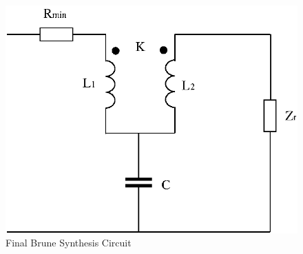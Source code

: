 \begin{figure}[ht]
\centering
\includegraphics[scale=0.7]{./Imgs/Brune_2.eps}
\caption{Final Brune Synthesis Circuit}
\label{fig:Brune_2}
\end{figure}
%

